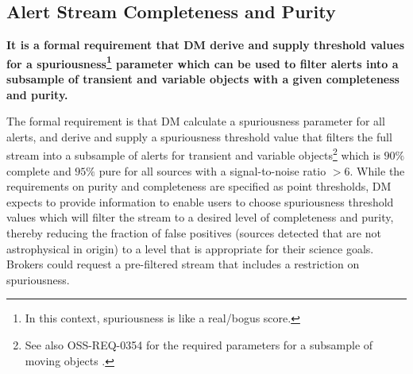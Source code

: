 \documentclass[DM,authoryear,toc]{lsstdoc}
\begin{document}


\subsection{Alert Stream Completeness and Purity}\label{ssec:comp_pure}

{\bf It is a formal requirement that DM derive and supply threshold values for a spuriousness\footnote{In this context, spuriousness is like a real/bogus score.} parameter which can be used to filter alerts into a subsample of transient and variable objects with a given completeness and purity.}

The formal requirement is that DM calculate a spuriousness parameter for all alerts, and derive and supply a spuriousness threshold value that filters the full stream into a subsample of alerts for transient and variable objects\footnote{See also OSS-REQ-0354 for the required parameters for a subsample of moving objects .} which is $90\%$ complete and $95\%$ pure for all sources with a signal-to-noise ratio $>6$. While the requirements on purity and completeness are specified as point thresholds, DM expects to provide information to enable users to choose spuriousness threshold values which will filter the stream to a desired level of completeness and purity, thereby reducing the fraction of false positives (sources detected that are not astrophysical in origin) to a level that is appropriate for their science goals. Brokers could request a pre-filtered stream that includes a restriction on spuriousness.
\end{document}
